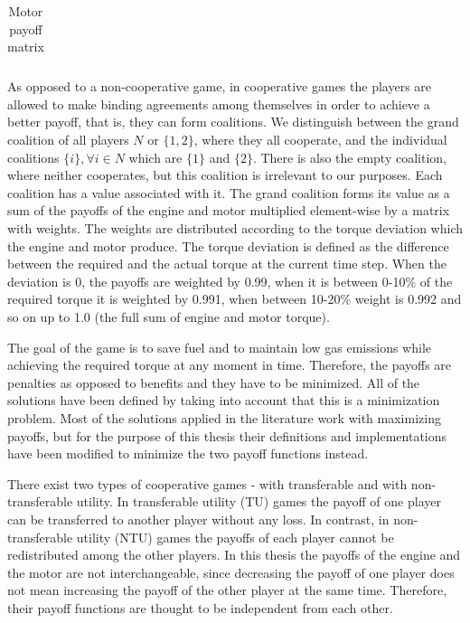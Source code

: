 {\begin{table}[h]
\begin{tabular}{ |c|c|c|c|c|c|c|c| }
\end{tabular}
\caption{Motor payoff matrix}
\label{tab:payoffMotor}
\end{table}

As opposed to a non-cooperative game, in cooperative games the players are allowed to make binding agreements among themselves in order to achieve a better payoff, that is, they can form coalitions. We distinguish between the grand coalition of all players $N$ or $\{1,2\}$, where they all cooperate, and the individual coalitions $\{i\}, \forall i \in N$ which are $\{1\}$ and $\{2\}$. There is also the empty coalition, where neither cooperates, but this coalition is irrelevant to our purposes. Each coalition has a value associated with it. The grand coalition forms its value as a sum of the payoffs of the engine and motor multiplied element-wise by a matrix with weights. The weights are distributed according to the torque deviation which the engine and motor produce. The torque deviation is defined as the difference between the required and the actual torque at the current time step. When the deviation is 0, the payoffs are weighted by 0.99, when it is between 0-10\% of the required torque it is weighted by 0.991, when between 10-20\% weight is 0.992 and so on up to 1.0 (the full sum of engine and motor torque).


The goal of the game is to save fuel and to maintain low gas emissions while achieving the required torque at any moment in time. Therefore, the payoffs are penalties as opposed to benefits and they have to be minimized. All of the solutions have been defined by taking into account that this is a minimization problem. Most of the solutions applied in the literature work with maximizing payoffs, but for the purpose of this thesis their definitions and implementations have been modified to minimize the two payoff functions instead. 


There exist two types of cooperative games - with transferable and with non-transferable utility. In transferable utility (TU) games the payoff of one player can be transferred to another player without any loss. In contrast, in non-transferable utility (NTU) games the payoffs of each player cannot be redistributed among the other players. In this thesis the payoffs of the engine and the motor are not interchangeable, since decreasing the payoff of one player does not mean increasing the payoff of the other player at the same time. Therefore, their payoff functions are thought to be independent from each other.

}
